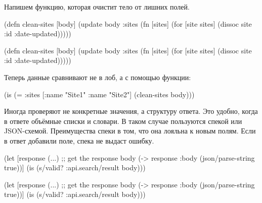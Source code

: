 
\noindent
Напишем функцию, которая очистит тело от лишних полей.

\ifnarrow

\begin{english}
  \begin{clojure}
(defn clean-sites [body]
 (update body :sites
  (fn [sites]
   (for [site sites]
    (dissoc site :id :date-updated)))))
  \end{clojure}
\end{english}

\else

\begin{english}
  \begin{clojure}
(defn clean-sites [body]
  (update body :sites
          (fn [sites]
            (for [site sites]
              (dissoc site :id :date-updated)))))
  \end{clojure}
\end{english}

\fi

\noindent
Теперь данные сравнивают не в лоб, а с помощью функции:

\begin{english}
  \begin{clojure}
(is (= {:sites [{:name "Site1"}
                {:name "Site2"}]}
       (clean-sites body)))
  \end{clojure}
\end{english}

Иногда проверяют не конкретные значения, а структуру ответа. Это удобно, когда в
ответе объёмные списки и словари. В таком случае пользуются спекой или
JSON-схемой. Преимущества спеки в том, что она лояльна к новым полям. Если в
ответ добавили поле, спека не выдаст ошибку.


\ifnarrow

\begin{english}
  \begin{clojure}
(let [response (...) ;; get the response
      body (-> response
               :body
               (json/parse-string
                 true))]
  (is (s/valid? :api.search/result
                body)))
  \end{clojure}
\end{english}

\else

\begin{english}
  \begin{clojure}
(let [response (...) ;; get the response
      body (-> response
               :body
               (json/parse-string true))]
  (is (s/valid? :api.search/result body)))
  \end{clojure}
\end{english}

